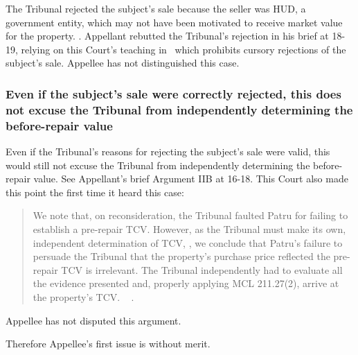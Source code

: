 \documentclass[12pt,\documentclassflag]{michiganCourtOfAppealsBrief}
\begin{document}
The Tribunal rejected the subject's sale because the seller was HUD, a government entity, which may not have been motivated to receive market value for the property. \reconsiderationDenied[2]. Appellant rebutted the Tribunal's rejection in his brief at 18-19, relying on this Court's teaching in \cite{Jones & Laughlin}\ which prohibits cursory rejections of the subject's sale. Appellee has not distinguished this case.

\subsubsection{Even if the subject's sale were correctly rejected, this does not excuse the Tribunal from independently determining the before-repair value}

Even if the Tribunal's reasons for rejecting the subject's  sale were valid, this would still not excuse the Tribunal from independently determining the before-repair value. See Appellant's brief Argument IIB at 16-18. This Court also made this point the first time it heard this case:

\begin{quote}
We note that, on reconsideration, the Tribunal faulted Patru for failing to establish a pre-repair TCV. However, as the Tribunal must make its own, independent determination of TCV,
,
we conclude that Patru's failure to persuade the Tribunal that the property's purchase price reflected the pre-repair TCV is irrelevant. The Tribunal independently had to evaluate all the evidence presented and, properly applying MCL 211.27(2), arrive at the property's TCV. ~ .
\end{quote}

Appellee has not disputed this argument.

Therefore Appellee's first issue is without merit.




\end{document}
